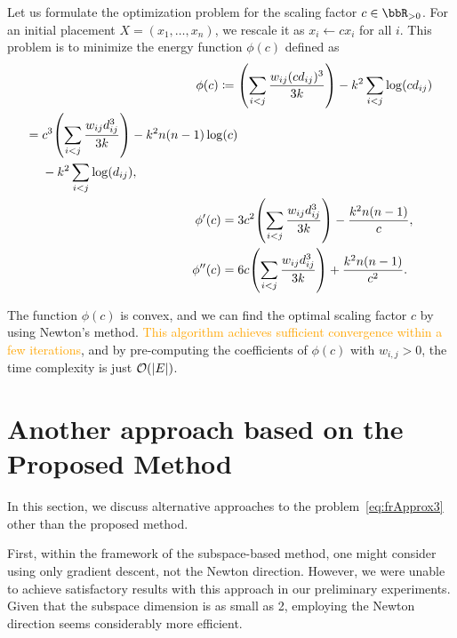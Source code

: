 \documentclass[dvipdfmx,journal]{IEEEtran}
\newcommand{\orange}[1]{\textcolor{orange}{#1}}
\newcommand{\defeq}{\coloneqq}
\begin{document}
Let us formulate the optimization problem for the scaling factor $c \in \bbR_{> 0}$. For an initial placement $X = (x_1, \dots, x_n)$, we rescale it as $x_i \gets c x_i$ for all $i$.
This problem is to minimize the energy function $\phi(c)$ defined as
\begin{align*}
  \phi(c) \defeq {} & \qty(\sum_{i < j} \frac{w_{ij} (cd_{ij})^3}{3k}) - k^2 \sum_{i < j} \log(c d_{ij})                                   \\
  \begin{split}
    = {} & c^3 \qty(\sum_{i < j} \frac{w_{ij} d_{ij}^3}{3k}) - k^2 n(n-1)\log(c) \\
         & - k^2 \sum_{i < j} \log(d_{ij}),
  \end{split} \\
  \phi'(c) = {}     & 3c^2 \qty(\sum_{i < j} \frac{w_{ij} d_{ij}^3}{3k}) - \frac{k^2 n(n-1)}{c},                                           \\
  \phi''(c) = {}    & 6c \qty(\sum_{i < j} \frac{w_{ij} d_{ij}^3}{3k}) + \frac{k^2 n(n-1)}{c^2}.
\end{align*}

The function $\phi(c)$ is convex, and we can find the optimal scaling factor $c$ by using Newton's method.
\orange{This algorithm achieves sufficient convergence within a few iterations}, and by pre-computing the coefficients of $\phi(c)$ with $w_{i,j} > 0$, the time complexity is just $\order{\abs{E}}$.

\section{Another approach based on the Proposed Method}\label{sec:anotherApproach}

In this section, we discuss alternative approaches to the problem~\eqref{eq:frApprox3} other than the proposed method.

First, within the framework of the subspace-based method, one might consider using only gradient descent, not the Newton direction.
However, we were unable to achieve satisfactory results with this approach in our preliminary experiments.
Given that the subspace dimension is as small as 2, employing the Newton direction seems considerably more efficient.
\end{document}
